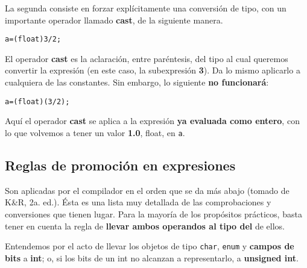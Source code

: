 La segunda consiste en forzar explícitamente una conversión de tipo, con un importante operador
llamado \textbf{cast}, de la siguiente manera.
\begin{lstlisting}
a=(float)3/2;
\end{lstlisting}

El operador \textbf{cast} es la aclaración, entre paréntesis, del tipo al cual queremos convertir la expresión (en este caso, la subexpresión \textbf{3}). Da lo mismo aplicarlo a cualquiera de las constantes. Sin embargo, lo siguiente \textbf{no funcionará}:
\begin{lstlisting}
a=(float)(3/2);
\end{lstlisting}

Aquí el operador \textbf{cast} se aplica a la expresión \textbf{ya evaluada como entero}, con lo que volvemos a tener
un valor \textbf{1.0}, float, en \texttt{a}.

\subsection{Reglas de promoción en expresiones}

Son aplicadas por el compilador en el orden que se da más abajo (tomado de K\&R, 2a. ed.). Ésta es
una lista muy detallada de las comprobaciones y conversiones que tienen lugar. Para la mayoría de los
propósitos prácticos, basta tener en cuenta la regla de \textbf{llevar ambos operandos al tipo del } de
ellos.

Entendemos por  el acto de llevar los objetos de tipo \texttt{char}, \texttt{enum} y \textbf{campos de bits} a \textbf{int}; o, si los bits de un int no alcanzan a representarlo, a \textbf{unsigned int}.
\\
\\

